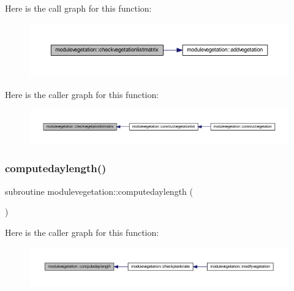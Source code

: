 Here is the call graph for this function\+:\nopagebreak
\begin{figure}[H]
\begin{center}
\leavevmode
\includegraphics[width=350pt]{namespacemodulevegetation_a487744668471d5e49ad9df7d7686866e_cgraph}
\end{center}
\end{figure}
Here is the caller graph for this function\+:\nopagebreak
\begin{figure}[H]
\begin{center}
\leavevmode
\includegraphics[width=350pt]{namespacemodulevegetation_a487744668471d5e49ad9df7d7686866e_icgraph}
\end{center}
\end{figure}
\mbox{\label{namespacemodulevegetation_a722712ec8addb85933d86a2bc0fa41aa}} 
\subsubsection{\texorpdfstring{computedaylength()}{computedaylength()}}
{\footnotesize\ttfamily subroutine modulevegetation\+::computedaylength (\begin{DoxyParamCaption}{ }\end{DoxyParamCaption})\hspace{0.3cm}{\ttfamily [private]}}

Here is the caller graph for this function\+:\nopagebreak
\begin{figure}[H]
\begin{center}
\leavevmode
\includegraphics[width=350pt]{namespacemodulevegetation_a722712ec8addb85933d86a2bc0fa41aa_icgraph}
\end{center}
\end{figure}
\mbox{\label{namespacemodulevegetation_a9bed5257328690b46cde01cfe91f313a}} 
